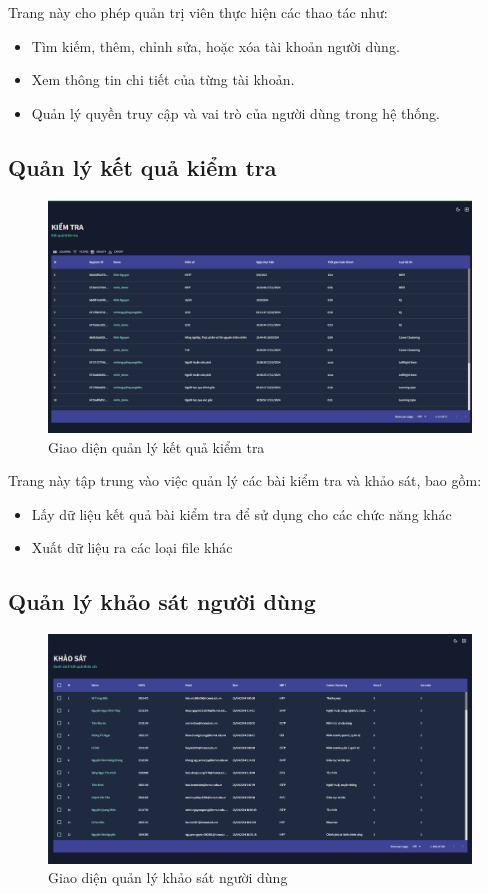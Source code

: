 Trang này cho phép quản trị viên thực hiện các thao tác như:
\begin{itemize}
    \item Tìm kiếm, thêm, chỉnh sửa, hoặc xóa tài khoản người dùng.
    \item Xem thông tin chi tiết của từng tài khoản.
    \item Quản lý quyền truy cập và vai trò của người dùng trong hệ thống.
\end{itemize}

\subsection{Quản lý kết quả kiểm tra}
\label{sec:test_management}
\begin{figure}[H]
    \centering
    \includegraphics[width=0.75\linewidth]{images/testAdmin.png}
    \vspace{0.6cm}
    \caption{Giao diện quản lý kết quả kiểm tra}
\end{figure}

Trang này tập trung vào việc quản lý các bài kiểm tra và khảo sát, bao gồm:
\begin{itemize}
    \item Lấy dữ liệu kết quả bài kiểm tra để sử dụng cho các chức năng khác 
    \item Xuất dữ liệu ra các loại file khác
\end{itemize}

\subsection{Quản lý khảo sát người dùng}
\label{sec:survey_management}
\begin{figure}[H]
    \centering
    \includegraphics[width=0.75\linewidth]{images/surAdmin.png}
    \vspace{0.6cm}
    \caption{Giao diện quản lý khảo sát người dùng}
\end{figure}

